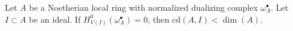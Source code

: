 \begin{lemma}
\label{lemma-cd-bound-dualizing}
Let $A$ be a Noetherian local ring with
normalized dualizing complex $\omega_A^\bullet$.
Let $I \subset A$ be an ideal.
If $H^0_{V(I)}(\omega_A^\bullet) = 0$, then $\text{cd}(A, I) < \dim(A)$.
\end{lemma}